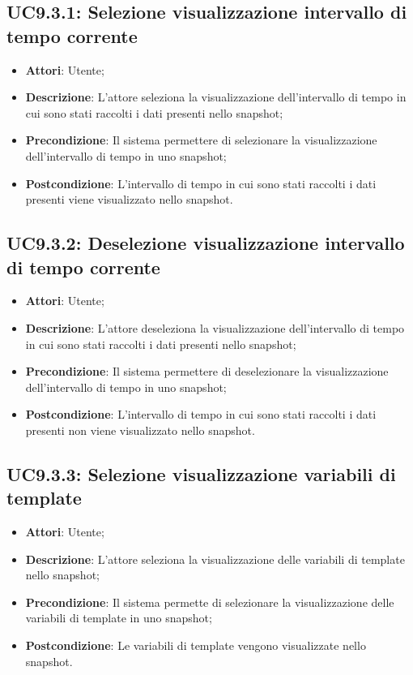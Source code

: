 \subsection{UC9.3.1: Selezione visualizzazione intervallo di tempo corrente}
\begin{itemize}
	\item \textbf{Attori}: Utente;
	\item \textbf{Descrizione}: L'attore seleziona la visualizzazione dell'intervallo di tempo in cui sono stati raccolti i dati presenti nello snapshot;
	\item \textbf{Precondizione}: Il sistema permettere di selezionare la visualizzazione dell'intervallo di tempo in uno snapshot;
	\item \textbf{Postcondizione}: L'intervallo di tempo in cui sono stati raccolti i dati presenti viene visualizzato nello snapshot.
\end{itemize}

\subsection{UC9.3.2: Deselezione visualizzazione intervallo di tempo corrente}
\begin{itemize}
	\item \textbf{Attori}: Utente;
	\item \textbf{Descrizione}: L'attore deseleziona la visualizzazione dell'intervallo di tempo in cui sono stati raccolti i dati presenti nello snapshot;
	\item \textbf{Precondizione}: Il sistema permettere di deselezionare la visualizzazione dell'intervallo di tempo in uno snapshot;
	\item \textbf{Postcondizione}: L'intervallo di tempo in cui sono stati raccolti i dati presenti non viene visualizzato nello snapshot.
\end{itemize}

\subsection{UC9.3.3: Selezione visualizzazione variabili di template}
\begin{itemize}
	\item \textbf{Attori}: Utente;
	\item \textbf{Descrizione}: L'attore seleziona la visualizzazione delle variabili di template nello snapshot;
	\item \textbf{Precondizione}: Il sistema permette di selezionare la visualizzazione delle variabili di template in uno snapshot;
	\item \textbf{Postcondizione}: Le variabili di template vengono visualizzate nello snapshot.
\end{itemize}

